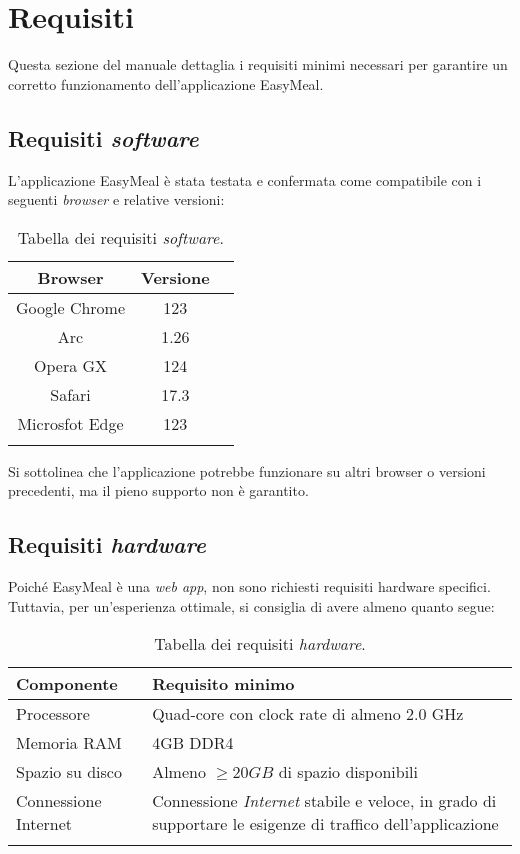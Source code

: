 \section{Requisiti}
Questa sezione del manuale dettaglia i requisiti minimi necessari per garantire 
un corretto funzionamento dell'applicazione EasyMeal.

\subsection{Requisiti \textit{software}}
L'applicazione EasyMeal è stata testata e confermata come compatibile con i 
seguenti \textit{browser} e relative versioni: 

\begin{longtable}{|c|c|c|}
	\hline
	\textbf{Browser}       & \textbf{ Versione}    \\
	\hline
    Google Chrome             & 123                    \\
    \hline
    Arc                       & 1.26                    \\
    \hline
    Opera GX                       & 124                    \\
    \hline
    Safari                        & 17.3                    \\
    \hline
    Microsfot Edge                 & 123                      \\
    \hline

    \caption{Tabella dei requisiti \textit{software}.}
\end{longtable}

Si sottolinea che l'applicazione potrebbe funzionare su altri browser o versioni 
precedenti, ma il pieno supporto non è garantito.


\subsection{Requisiti \textit{hardware}}
Poiché EasyMeal è una \textit{web app}, non sono richiesti requisiti hardware specifici. 
Tuttavia, per un'esperienza ottimale, si consiglia di avere almeno quanto segue:

\begin{longtable}{|l|p{}|}
	\hline
	\textbf{Componente}       & \textbf{ Requisito minimo}   \\
	\hline
     Processore             &  Quad-core con clock rate di almeno 2.0 GHz      \\
    \hline
     Memoria RAM            &  4GB DDR4       \\
    \hline
    Spazio su disco         &  Almeno $ \geq  20 GB$ di spazio disponibili        \\
    \hline
    Connessione Internet         & Connessione \textit{Internet} stabile e veloce, in grado di supportare le esigenze di traffico dell'applicazione         \\
    \hline

    \caption{Tabella dei requisiti \textit{hardware}.}
\end{longtable}
